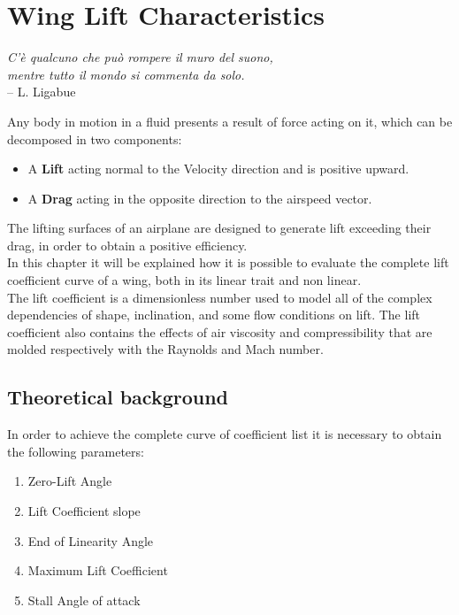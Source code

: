 \chapter{Wing Lift Characteristics}
\label{ch:worklift}

\begin{flushright}
	{\smaller
		\textit{C'è qualcuno che può rompere il muro del suono,\\ mentre tutto il mondo si commenta da solo.}\\
		-- L. Ligabue}
\end{flushright}


Any body in motion in a fluid presents a result of force acting on it, which can be decomposed in two components:
\begin{itemize}
\item A {\bfseries Lift} acting normal to the Velocity direction and is positive upward.
\item A {\bfseries Drag} acting in the opposite direction to the airspeed vector.
\end{itemize}
The lifting surfaces of an airplane are designed to generate lift exceeding their drag, in order to obtain a positive efficiency. \\ In this chapter it will be explained how it is possible to evaluate the complete lift coefficient curve of a wing, both in its linear trait and non linear.\\
The lift coefficient is a dimensionless number used to model all of the complex dependencies of shape, inclination, and some flow conditions on lift. The lift coefficient also contains the effects of air viscosity and compressibility that are molded respectively with the Raynolds and Mach number.%

\section{Theoretical background}

In order to achieve the complete curve of coefficient list it is necessary to obtain the following parameters:

\begin{enumerate}
\item Zero-Lift Angle
\item Lift Coefficient slope 
\item End of Linearity Angle
\item Maximum Lift Coefficient
\item Stall Angle of attack
\end{enumerate}

